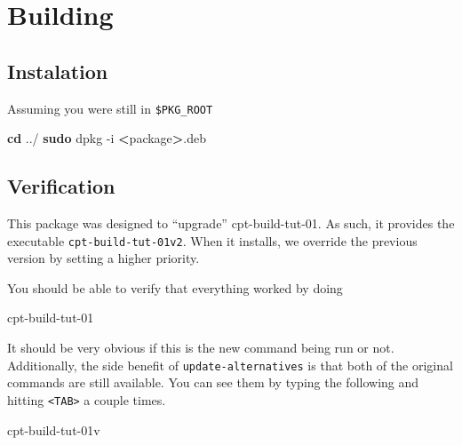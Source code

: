 \documentclass[]{article}
\newenvironment{Shaded}{}{}
\newcommand{\KeywordTok}[1]{\textcolor[rgb]{0.00,0.44,0.13}{\textbf{{#1}}}}
\newcommand{\OtherTok}[1]{\textcolor[rgb]{0.00,0.44,0.13}{{#1}}}
\newcommand{\NormalTok}[1]{{#1}}
\begin{document}
\section{Building}

\begin{Shaded}
\end{Shaded}
\subsection{Instalation}

Assuming you were still in \texttt{\$PKG\_ROOT}

\begin{Shaded}
\begin{Highlighting}[]
\KeywordTok{cd} \NormalTok{../}
\KeywordTok{sudo} \NormalTok{dpkg -i }\KeywordTok{<}\NormalTok{package}\KeywordTok{>}\NormalTok{.deb}
\end{Highlighting}
\end{Shaded}
\subsection{Verification}

This package was designed to ``upgrade'' cpt-build-tut-01. As such, it
provides the executable \texttt{cpt-build-tut-01v2}. When it installs,
we override the previous version by setting a higher priority.

You should be able to verify that everything worked by doing

\begin{Shaded}
\begin{Highlighting}[]
\NormalTok{cpt-build-tut-01}
\end{Highlighting}
\end{Shaded}
It should be very obvious if this is the new command being run or not.
Additionally, the side benefit of \texttt{update-alternatives} is that
both of the original commands are still available. You can see them by
typing the following and hitting \texttt{\textless{}TAB\textgreater{}} a
couple times.

\begin{Shaded}
\begin{Highlighting}[]
\NormalTok{cpt-build-tut-01v}
\end{Highlighting}
\end{Shaded}
\end{document}
